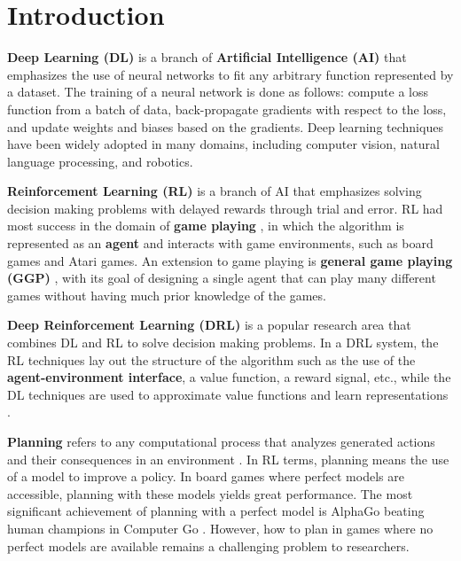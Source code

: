 \chapter{Introduction} \label{sec:intro}

\textbf{Deep Learning (DL)} is a branch of \textbf{Artificial Intelligence (AI)} that emphasizes the use of neural networks to fit any arbitrary function represented by a dataset.
The training of a neural network is done as follows: compute a loss function from a batch of data, back-propagate gradients with respect to the loss, and update weights and biases based on the gradients.
Deep learning techniques have been widely adopted in many domains, including computer vision, natural language processing, and robotics.

\textbf{Reinforcement Learning (RL)} is a branch of AI that emphasizes solving decision making problems with delayed rewards through trial and error.
RL had most success in the domain of \textbf{game playing} \cite{MasteringGameGo_Silver.Schrittwieser.ea_2017}, in which the algorithm is represented as an \textbf{agent} and interacts with game environments, such as board games and Atari games.
An extension to game playing is \textbf{general game playing (GGP)} \cite{GeneralGamePlaying__}, with its goal of designing a single agent that can play many different games without having much prior knowledge of the games.

\textbf{Deep Reinforcement Learning (DRL)} is a popular research area that combines DL and RL to solve decision making problems.
In a DRL system, the RL techniques lay out the structure of the algorithm such as the use of the \textbf{agent-environment interface}, a value function, a reward signal, etc., while the DL techniques are used to approximate value functions and learn representations \cite{ReinforcementLearningIntroduction_Sutton.Barto_2018}.

\textbf{Planning} refers to any computational process that analyzes generated actions and their consequences in an environment \cite{ReinforcementLearningIntroduction_Sutton.Barto_2018}.
In RL terms, planning means the use of a model to improve a policy.
In board games where perfect models are accessible, planning with these models yields great performance.
The most significant achievement of planning with a perfect model is AlphaGo beating human champions in Computer Go \cite{MasteringGameGo_Silver.Schrittwieser.ea_2017}.
However, how to plan in games where no perfect models are available remains a challenging problem to researchers.

